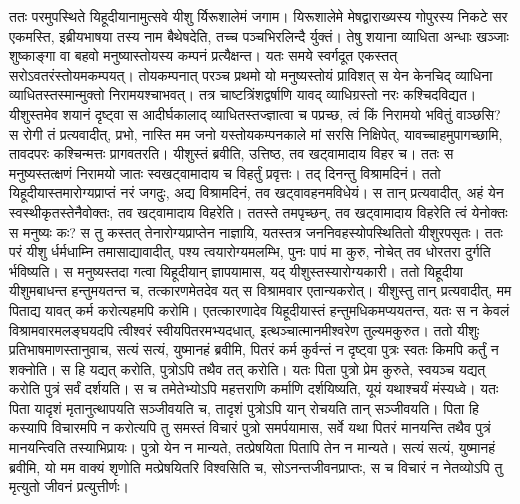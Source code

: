 \adhyAya
{}
\vakya ततः परमुपस्थिते यिहूदीयानामुत्सवे यीशु र्यिरूशालेमं जगाम।
\vakya यिरूशालेमे मेषद्वाराख्यस्य गोपुरस्य निकटे सर एकमस्ति, इब्रीयभाषया तस्य नाम बैथेषदेति, तच्च पञ्चभिरलिन्दै र्युक्तं।
\vakya तेषु शयाना व्याधिता अन्धाः खञ्जाः शुष्काङ्गा वा बहवो मनुष्यास्तोयस्य कम्पनं प्रत्यैक्षन्त।
\vakya यतः समये स्वर्गदूत एकस्तत् सरोऽवतरंस्तोयमकम्पयत्। तोयकम्पनात् परञ्च प्रथमो यो मनुष्यस्तोयं प्राविशत् स येन केनचिद् व्याधिना व्याधितस्तस्मान्मुक्तो निरामयश्चाभवत्।
\vakya तत्र चाष्टत्रिंशद्वर्षाणि यावद् व्याधिग्रस्तो नरः कश्चिदविद्यत।
\vakya यीशुस्तमेव शयानं दृष्ट्वा स आदीर्घकालाद् व्याधितस्तज्ज्ञात्वा च पप्रच्छ, त्वं किं निरामयो भवितुं वाञ्छसि?
\vakya स रोगी तं प्रत्यवादीत्, प्रभो, नास्ति मम जनो यस्तोयकम्पनकाले मां सरसि निक्षिपेत्, यावच्चाहमुपागच्छामि, तावदपरः कश्चिन्मत्तः प्रागवतरति।
\vakya यीशुस्तं ब्रवीति, उत्तिष्ठ, तव खट्वामादाय विहर च।
\vakya ततः स मनुष्यस्तत्क्षणं निरामयो जातः स्वखट्वामादाय च विहर्तुं प्रवृत्तः। तद् दिनन्तु विश्रामदिनं।
\vakya ततो यिहूदीयास्तमारोग्यप्राप्तं नरं जगदुः, अद्य विश्रामदिनं, तव खट्वावहनमविधेयं।
\vakya स तान् प्रत्यवादीत्, अहं येन स्वस्थीकृतस्तेनैवोक्तः, तव खट्वामादाय विहरेति।
\vakya ततस्ते तमपृच्छन्, तव खट्वामादाय विहरेति त्वं येनोक्तः स मनुष्यः कः?
\vakya स तु कस्तत् तेनारोग्यप्राप्तेन नाज्ञायि, यतस्तत्र जननिवहस्योपस्थितितो यीशुरपसृतः।
\vakya ततः परं यीशु र्धर्मधाम्नि तमासाद्यावादीत्, पश्य त्वयारोग्यमलम्भि, पुनः पापं मा कुरु, नोचेत् तव धोरतरा दुर्गति र्भविष्यति।
\vakya स मनुष्यस्तदा गत्वा यिहूदीयान् ज्ञापयामास, यद् यीशुस्तस्यारोग्यकारी।
\vakya ततो यिहूदीया यीशुमबाधन्त हन्तुमयतन्त च, तत्कारणमेतदेव यत् स विश्रामवार एतान्यकरोत्।
\vakya यीशुस्तु तान् प्रत्यवादीत्, मम पिताद्य यावत् कर्म करोत्यहमपि करोमि।
\vakya एतत्कारणादेव यिहूदीयास्तं हन्तुमधिकमप्ययतन्त, यतः स न केवलं विश्रामवारमलङ्घयदपि त्वीश्वरं स्वीयपितरमभ्यदधात्, इत्थञ्चात्मानमीश्वरेण तुल्यमकुरुत।
\vakya ततो यीशुः प्रतिभाषमाणस्तानुवाच, सत्यं सत्यं, युष्मानहं ब्रवीमि, पितरं कर्म कुर्वन्तं न दृष्ट्वा पुत्रः स्वतः किमपि कर्तुं न शक्नोति। स हि यद्यत् करोति, पुत्रोऽपि तथैव तत् करोति।
\vakya यतः पिता पुत्रो प्रेम कुरुते, स्वयञ्च यद्यत् करोति पुत्रं सर्वं दर्शयति। स च तमेतेभ्योऽपि महत्तराणि कर्माणि दर्शयिष्यति, यूयं यथाश्चर्यं मंस्यध्वे।
\vakya यतः पिता यादृशं मृतानुत्थापयति सञ्जीवयति च, तादृशं पुत्रोऽपि यान् रोचयति तान् सञ्जीवयति।
\vakya पिता हि कस्यापि विचारमपि न करोत्यपि तु समस्तं विचारं पुत्रो समर्पयामास,
\vakya सर्वे यथा पितरं मानयन्ति तथैव पुत्रं मानयन्त्विति तस्याभिप्रायः।
\vakya पुत्रो येन न मान्यते, तत्प्रेषयिता पितापि तेन न मान्यते। सत्यं सत्यं, युष्मानहं ब्रवीमि, यो मम वाक्यं शृणोति मत्प्रेषयितरि विश्वसिति च, सोऽनन्तजीवनप्राप्तः, स च विचारं न नेतव्योऽपि तु मृत्युतो जीवनं प्रत्युत्तीर्णः।
